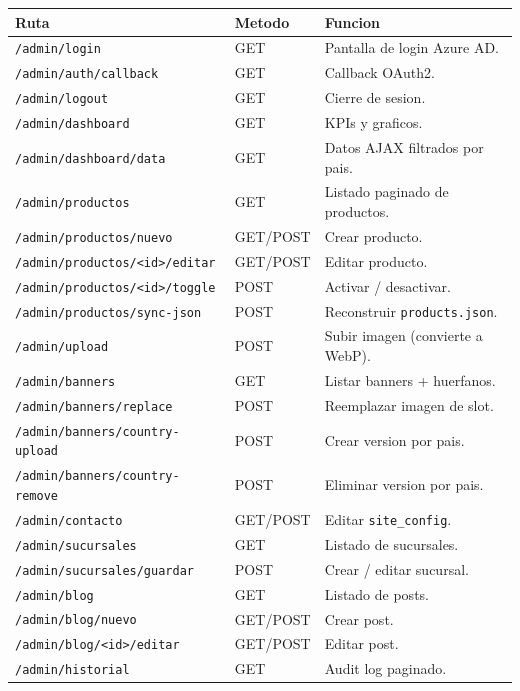 \documentclass[11pt,a4paper]{article}
\begin{document}
\begin{longtable}{p{6cm} p{2cm} p{6cm}}
\toprule
\textbf{Ruta} & \textbf{Metodo} & \textbf{Funcion} \\
\midrule
\endhead
\texttt{/admin/login}                       & GET           & Pantalla de login Azure AD. \\
\texttt{/admin/auth/callback}               & GET           & Callback OAuth2. \\
\texttt{/admin/logout}                      & GET           & Cierre de sesion. \\
\texttt{/admin/dashboard}                   & GET           & KPIs y graficos. \\
\texttt{/admin/dashboard/data}              & GET           & Datos AJAX filtrados por pais. \\
\texttt{/admin/productos}                   & GET           & Listado paginado de productos. \\
\texttt{/admin/productos/nuevo}             & GET/POST      & Crear producto. \\
\texttt{/admin/productos/<id>/editar}       & GET/POST      & Editar producto. \\
\texttt{/admin/productos/<id>/toggle}       & POST          & Activar / desactivar. \\
\texttt{/admin/productos/sync-json}         & POST          & Reconstruir \texttt{products.json}. \\
\texttt{/admin/upload}                      & POST          & Subir imagen (convierte a WebP). \\
\texttt{/admin/banners}                     & GET           & Listar banners + huerfanos. \\
\texttt{/admin/banners/replace}             & POST          & Reemplazar imagen de slot. \\
\texttt{/admin/banners/country-upload}      & POST          & Crear version por pais. \\
\texttt{/admin/banners/country-remove}      & POST          & Eliminar version por pais. \\
\texttt{/admin/contacto}                    & GET/POST      & Editar \texttt{site\_config}. \\
\texttt{/admin/sucursales}                  & GET           & Listado de sucursales. \\
\texttt{/admin/sucursales/guardar}          & POST          & Crear / editar sucursal. \\
\texttt{/admin/blog}                        & GET           & Listado de posts. \\
\texttt{/admin/blog/nuevo}                  & GET/POST      & Crear post. \\
\texttt{/admin/blog/<id>/editar}            & GET/POST      & Editar post. \\
\texttt{/admin/historial}                   & GET           & Audit log paginado. \\
\bottomrule
\end{longtable}
\end{document}
